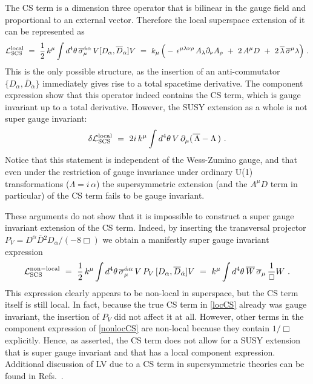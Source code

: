 \documentclass[12pt]{revtex4}
\begin{document}
The CS term is a dimension three operator that is bilinear in the
gauge field and proportional to an external vector. Therefore the
local superspace extension of it can be represented as 
%
\begin{equation}
{\cal L}_{\rm SCS}^{\rm local} ~=~ 
\frac 12 \, k^\mu \int d^4 \theta \, 
 \overline{\sigma}^{\dot{\alpha} \alpha}_\mu\, 
V [ D_\alpha, \overline{D}_{\dot\alpha}] V 
~=~
k_\mu \, \Big( 
- \,\epsilon^{\mu\lambda\nu\rho} \, 
A_\lambda \partial_\nu A_\rho
~+~ 
2\,  A^\mu D
~+~
2\, \overline{\lambda}\,\overline{\sigma}^\mu \lambda
\Big)~. 
\label{locCS}
\end{equation} 
%
This is the only possible structure, as the insertion of an
anti-commutator  $\{D_\alpha, \overline{D}_{\dot\alpha}\}$ immediately
gives rise to a total spacetime derivative. The component expression 
show that this operator indeed contains the CS term, which 
is gauge invariant up to a total derivative. However, the
SUSY extension as a whole is not super gauge invariant: 
%
\begin{equation}
\delta {\cal L}_{\rm SCS}^{\rm local} 
~=~ 2 i\, k^\mu 
\int d^4 \theta \, 
V\, \partial_\mu ( \overline{\, \Lambda} - \Lambda \,)~. 
\label{locCStrans} 
\end{equation} 
%
Notice that this statement is independent of the Wess-Zumino
gauge, and that even under the restriction of  gauge invariance
under ordinary U(1) transformations ($\Lambda = i \,\alpha$) the
supersymmetric extension (and the $A^\mu D$ term in particular)  of
the CS term fails to be gauge invariant.  



These arguments do not show that it is impossible to construct a super
gauge invariant extension of the CS term. Indeed, by inserting the
transversal projector 
$P_V = D^\alpha \overline{D}{}^2 D_\alpha/(-8 \Box)$
we obtain a manifestly super gauge invariant expression 
%
\begin{equation}
\label{nonlocCS}
{\cal L}_{\rm SCS}^{\rm non-local} ~=~ 
\frac 12 \, k^\mu \int d^4 \theta \, 
 \overline{\sigma}^{\dot{\alpha} \alpha}_\mu\, 
V\, P_V\,  [ D_\alpha, \overline{D}_{\dot\alpha}] V
~=~
k^\mu \int d^4 \theta \, 
\overline{W} \, \overline{\sigma}_\mu \, \frac 1{\Box} W
~.
\end{equation} 
%
This expression clearly appears to be non-local in superspace, but
the CS term itself is still local. In fact, because the true CS term
in \eqref{locCS} already was gauge invariant, the insertion of $P_V$
did not affect it  at all. However, other terms in the component
expression of \eqref{nonlocCS} are non-local because they contain
$1/\Box$ explicitly.  Hence, as asserted, the CS term does not allow
for a SUSY extension that is super gauge invariant and that has a
local component expression.  Additional discussion of LV due to a CS
term in supersymmetric theories  
can be found in Refs.~\cite{Belich:,Belich:2005js}.
\end{document}
